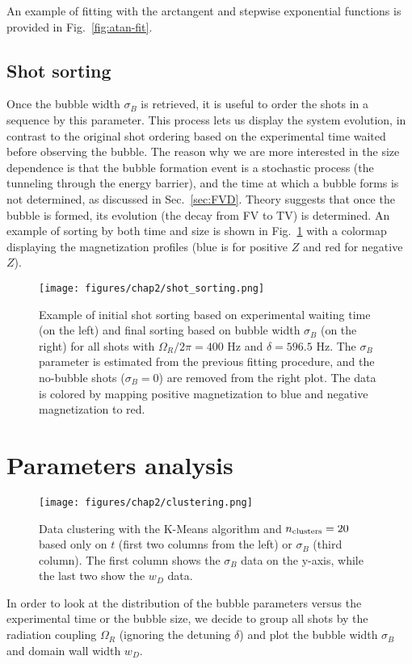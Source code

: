 An example of fitting with the arctangent and stepwise exponential functions is provided in Fig.\ \ref{fig:atan-fit}.

\subsection{Shot sorting}
Once the bubble width $\sigma_B$ is retrieved, it is useful to order the shots in a sequence by this parameter. This process lets us display the system evolution, in contrast to the original shot ordering based on the experimental time waited before observing the bubble.
The reason why we are more interested in the size dependence is that the bubble formation event is a stochastic process (the tunneling through the energy barrier), and the time at which a bubble forms is not determined, as discussed in Sec.\ \ref{sec:FVD}. 
Theory suggests that once the bubble is formed, its evolution (the decay from FV to TV) is determined. 
An example of sorting by both time and size is shown in Fig.\ \ref{fig:sorting} with a colormap displaying the magnetization profiles (blue is for positive $Z$ and red for negative $Z$).

\begin{figure}[ht!]
    \centering
    \texttt{[image: figures/chap2/shot\_sorting.png]}
    \caption{Example of initial shot sorting based on experimental waiting time (on the left) and final sorting based on bubble width $\sigma_B$ (on the right) for all shots with $\Omega_R/2\pi = 400$ \unit{\hertz} and $\delta = 596.5$ \unit{\hertz}. The $\sigma_B$ parameter is estimated from the previous fitting procedure, and the no-bubble shots ($\sigma_B = 0$) are removed from the right plot. The data is colored by mapping positive magnetization to blue and negative magnetization to red.}
    \label{fig:sorting}
\end{figure}

\section{Parameters analysis}
\label{sec:params}
\begin{figure}[ht!]
    \centering
    \texttt{[image: figures/chap2/clustering.png]}
    \caption{Data clustering with the K-Means algorithm and $n_{\rm clusters} = 20$ based only on $t$ (first two columns from the left) or $\sigma_B$ (third column). The first column shows the $\sigma_B$ data on the y-axis, while the last two show the $w_D$ data.}
    \label{fig:clust}
\end{figure} 
In order to look at the distribution of the bubble parameters versus the experimental time or the bubble size, we decide to group all shots by the radiation coupling $\Omega_R$ (ignoring the detuning $\delta$) and plot the bubble width $\sigma_B$ and domain wall width $w_D$. 

